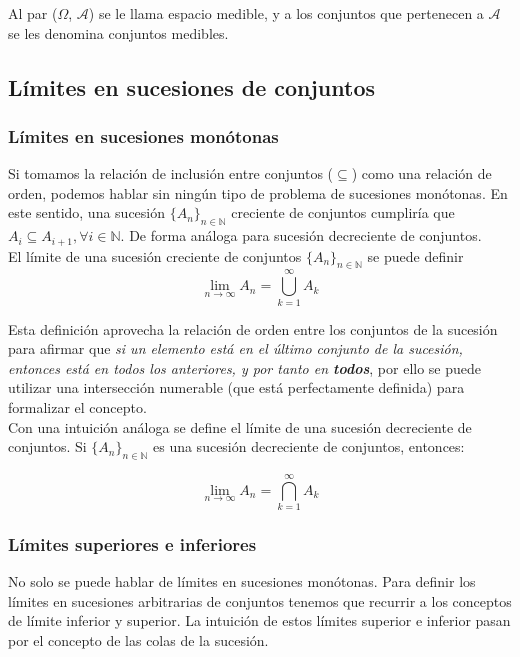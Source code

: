 Al par ($\Omega$, $\mathcal{A}$) se le llama espacio medible, y a los conjuntos que pertenecen a $\mathcal{A}$ se les denomina conjuntos medibles.

\subsection{Límites en sucesiones de conjuntos}

\subsubsection{Límites en sucesiones monótonas}

Si tomamos la relación de inclusión entre conjuntos ($\subseteq$) como una relación de orden, podemos hablar sin ningún tipo de problema de sucesiones monótonas. En este sentido, una sucesión   $\{A_n\}_{n \in \mathbb{N}}$  creciente de conjuntos cumpliría que $A_i \subseteq A_{i+1}, \forall i \in \mathbb{N}$. De forma análoga para sucesión decreciente de conjuntos.\\

El límite de una sucesión creciente de conjuntos $\{A_n\}_{n \in \mathbb{N} }$ se puede definir
$$\lim_{n\to\infty} A_n = \bigcup_{k=1}^{\infty} A_k$$

Esta definición aprovecha la relación de orden entre los conjuntos de la sucesión para afirmar que \textit{si un elemento está en el último conjunto de la sucesión, entonces está en todos los anteriores, y por tanto en \textbf{todos}}, por ello se puede utilizar una intersección numerable (que está perfectamente definida) para formalizar el concepto.\\

Con una intuición análoga se define el límite de una sucesión decreciente de conjuntos. Si $\{A_n\}_{n\in\mathbb{N}}$ es una sucesión decreciente de conjuntos, entonces:

$$ \lim_{n\to\infty} A_n = \bigcap_{k=1}^{\infty} A_k $$

\subsubsection{Límites superiores e inferiores}

No solo se puede hablar de límites en sucesiones monótonas. 
Para definir los límites en sucesiones arbitrarias de conjuntos tenemos que recurrir a los conceptos de límite inferior y superior. 
La intuición de estos límites superior e inferior pasan por el concepto de las colas de la sucesión.\\


